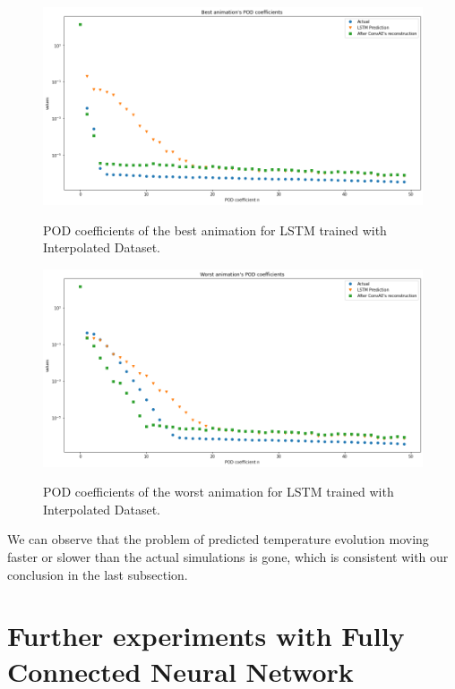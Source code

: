 \begin{figure}[H]
    \centering
    \caption{POD coefficients of the best animation for LSTM trained with Interpolated Dataset.}
    \includegraphics[scale=0.4]{figures/mantle_convection_images/larger_dataset_interpolated/LSTM_Best_POD.png}
    \label{figure:LSTM_interpolated_best_POD}
\end{figure}

\begin{figure}[H]
    \centering
    \caption{POD coefficients of the worst animation for LSTM trained with Interpolated Dataset.}
    \includegraphics[scale=0.4]{figures/mantle_convection_images/larger_dataset_interpolated/LSTM_Worst_POD.png}
    \label{figure:LSTM_interpolated_worst_POD}
\end{figure}


We can observe that the problem of predicted temperature evolution moving faster or slower than the actual simulations is gone, which is consistent with our conclusion in the last subsection.

\section{Further experiments with Fully Connected Neural Network}

